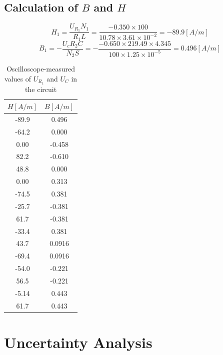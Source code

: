 \documentclass[12pt]{article}
\begin{document}
\subsection{Calculation of $B$ and $H$}
$$H_1=\frac{U_{R_1}N_1}{R_1 L}=\frac{-0.350\times100}{10.78\times3.61\times10^{-2}}=-89.9[A/m]$$
$$B_1=-\frac{U_c R_2 C}{N_2 S}=-\frac{-0.650\times219.49\times4.345}{100\times 1.25\times10^{-5}}=0.496[A/m]$$
\begin{table}[H]
\centering
\begin{tabular}{|c|c|}
\hline
$H[A/m]$ &$B[A/m]$  \\ \hline
-89.9 &0.496  \\ \hline
-64.2 &0.000  \\ \hline
0.00 &-0.458  \\ \hline
82.2 &-0.610  \\ \hline
48.8 &0.000  \\ \hline
0.00 &0.313  \\ \hline
-74.5 &0.381  \\ \hline
-25.7 &-0.381 \\ \hline
61.7 &-0.381  \\ \hline
-33.4 &0.381  \\ \hline
43.7 &0.0916 \\ \hline
-69.4 &0.0916  \\ \hline
-54.0 &-0.221  \\ \hline
56.5 &-0.221  \\ \hline
-5.14 &0.443  \\ \hline
61.7 &0.443 \\ \hline
\end{tabular}
\caption{Oscilloscope-measured values of $U_{R_1}$ and $U_C$ in the circuit}
\end{table}
\section{Uncertainty Analysis}
\end{document}
